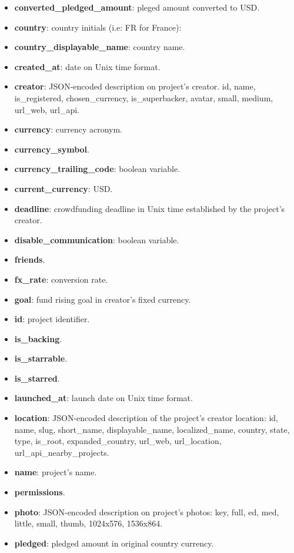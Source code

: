 \documentclass{article}
\begin{document}
\begin{itemize}
    \item \textbf{converted\_pledged\_amount}: pleged amount converted to USD.
    \item \textbf{country}: country initials (i.e: FR for France):
    \item \textbf{country\_displayable\_name}: country name.
    \item \textbf{created\_at}: date on Unix time format.
    \item \textbf{creator}: JSON-encoded description on project's creator. id, name, is\_registered, chosen\_currency, is\_superbacker, avatar, small, medium, url\_web, url\_api. 
    \item \textbf{currency}: currency acronym.
    \item \textbf{currency\_symbol}.
    \item \textbf{currency\_trailing\_code}: boolean variable.
    \item \textbf{current\_currency}: USD.
    \item \textbf{deadline}: crowdfunding deadline in Unix time established by the project's creator.
    \item \textbf{disable\_communication}: boolean variable.
    \item \textbf{friends}.
    \item \textbf{fx\_rate}: conversion rate.
    \item \textbf{goal}: fund rising goal in creator's fixed currency.
    \item \textbf{id}: project identifier.
    \item \textbf{is\_backing}.
    \item \textbf{is\_starrable}.
    \item \textbf{is\_starred}.
    \item \textbf{launched\_at}: launch date on Unix time format.
    \item \textbf{location}: JSON-encoded description of the project's creator location: id, name, slug, short\_name, displayable\_name, localized\_name, country, state, type, is\_root, expanded\_country, url\_web, url\_location, url\_api\_nearby\_projects.
    \item \textbf{name}: project's name.
    \item \textbf{permissions}.
    \item \textbf{photo}: JSON-encoded description on project's photos: key, full, ed, med, little, small, thumb, 1024x576, 1536x864.
    \item \textbf{pledged}: pledged amount in original country currency.

\end{itemize}
\end{document}
